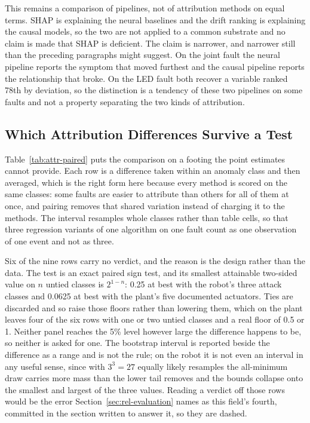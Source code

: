 This remains a comparison of pipelines, not of attribution methods on equal terms. SHAP is explaining the neural baselines and the drift ranking is explaining the causal models, so the two are not applied to a common substrate and no claim is made that SHAP is deficient. The claim is narrower, and narrower still than the preceding paragraphs might suggest. On the joint fault the neural pipeline reports the symptom that moved furthest and the causal pipeline reports the relationship that broke. On the LED fault both recover a variable ranked 78th by deviation, so the distinction is a tendency of these two pipelines on some faults and not a property separating the two kinds of attribution.

\subsection{Which Attribution Differences Survive a Test}
\label{sec:attr-intervals}

Table~\ref{tab:attr-paired} puts the comparison on a footing the point estimates cannot provide. Each row is a difference taken within an anomaly class and then averaged, which is the right form here because every method is scored on the same classes: some faults are easier to attribute than others for all of them at once, and pairing removes that shared variation instead of charging it to the methods. The interval resamples whole classes rather than table cells, so that three regression variants of one algorithm on one fault count as one observation of one event and not as three.



Six of the nine rows carry no verdict, and the reason is the design rather than the data. The test is an exact paired sign test, and its smallest attainable two-sided value on $n$ untied classes is $2^{1-n}$: 0.25 at best with the robot's three attack classes and 0.0625 at best with the plant's five documented actuators. Ties are discarded and so raise those floors rather than lowering them, which on the plant leaves four of the six rows with one or two untied classes and a real floor of 0.5 or 1. Neither panel reaches the 5\% level however large the difference happens to be, so neither is asked for one. The bootstrap interval is reported beside the difference as a range and is not the rule; on the robot it is not even an interval in any useful sense, since with $3^3 = 27$ equally likely resamples the all-minimum draw carries more mass than the lower tail removes and the bounds collapse onto the smallest and largest of the three values. Reading a verdict off those rows would be the error Section~\ref{sec:rel-evaluation} names as this field's fourth, committed in the section written to answer it, so they are dashed.

